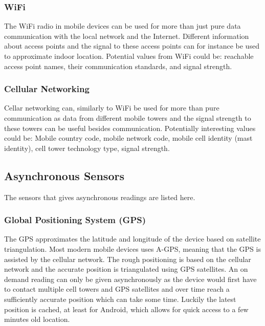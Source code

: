 \subsubsection{WiFi}
\label{sub:wifi}
The WiFi radio in mobile devices can be used for more than just pure data communication with the local network and the Internet. Different information about access points and the signal to these access points can for instance be used to approximate indoor location.  
Potential values from WiFi could be: reachable access point names, their communication standards, and signal strength.

\subsubsection{Cellular Networking}
\label{sub:cellular_networking}
Cellar networking can, similarly to WiFi be used for more than pure communication as data from different mobile towers and the signal strength to these towers can be useful besides communication. Potentially interesting values could be: Mobile country code, mobile network code, mobile cell identity (mast identity), cell tower technology type, signal strength.

\subsection{Asynchronous Sensors}
\label{sub:asynchronous_sensors}
The sensors that gives asynchronous readings are listed here.

\subsubsection{Global Positioning System (GPS)}
\label{sub:gps}
The GPS approximates the latitude and longitude of the device based on satellite triangulation. Most modern mobile devices uses A-GPS, meaning that the GPS is assisted by the cellular network. The rough positioning is based on the cellular network and the accurate position is triangulated using GPS satellites. An on demand reading can only be given asynchronously as the device would first have to contact multiple cell towers and GPS satellites and over time reach a sufficiently accurate position which can take some time. Luckily the latest position is cached, at least for Android, which allows for quick access to a few minutes old location. 


